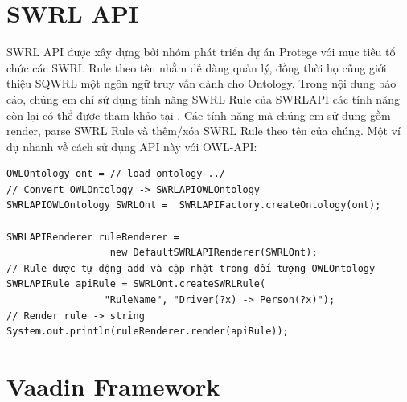 \section{SWRL API}
SWRL API được xây dựng bởi nhóm phát triển dự án Protege \cite{protege} với mục tiêu tổ chức các SWRL Rule theo tên nhằm dễ dàng quản lý, đồng thời họ cũng giới thiệu SQWRL \cite{swrlapi} một ngôn ngữ truy vấn dành cho Ontology. Trong nội dung báo cáo, chúng em chỉ sử dụng tính năng SWRL Rule của SWRLAPI các tính năng còn lại có thể được tham khảo tại \cite{swrlapi}. Các tính năng mà chúng em sử dụng gồm render, parse SWRL Rule và thêm/xóa SWRL Rule theo tên của chúng. Một ví dụ nhanh về cách sử dụng API này với OWL-API:
\begin{verbatim}
OWLOntology ont = // load ontology ../
// Convert OWLOntology -> SWRLAPIOWLOntology
SWRLAPIOWLOntology SWRLOnt =  SWRLAPIFactory.createOntology(ont);
   
SWRLAPIRenderer ruleRenderer = 
                  new DefaultSWRLAPIRenderer(SWRLOnt);
// Rule được tự động add và cập nhật trong đối tượng OWLOntology                  
SWRLAPIRule apiRule = SWRLOnt.createSWRLRule(
                 "RuleName", "Driver(?x) -> Person(?x)");
// Render rule -> string
System.out.println(ruleRenderer.render(apiRule));
\end{verbatim}

\section{Vaadin Framework }
